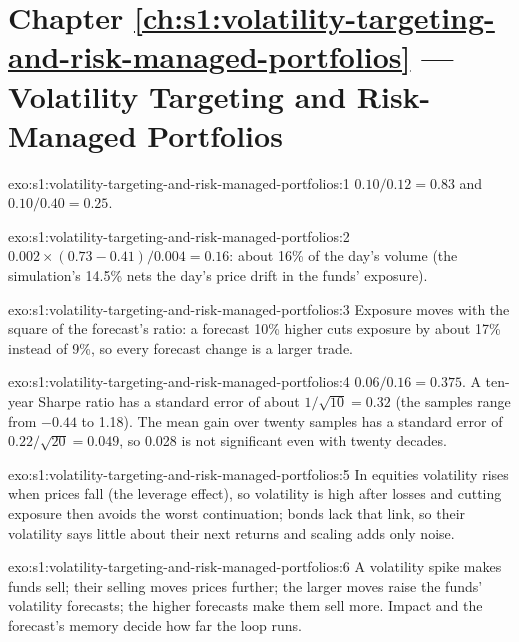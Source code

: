 \section*{Chapter \ref{ch:s1:volatility-targeting-and-risk-managed-portfolios} --- Volatility Targeting and Risk-Managed Portfolios}

\begin{solution}{exo:s1:volatility-targeting-and-risk-managed-portfolios:1}
$0.10/0.12 = 0.83$ and $0.10/0.40 = 0.25$.
\end{solution}

\begin{solution}{exo:s1:volatility-targeting-and-risk-managed-portfolios:2}
$0.002 \times (0.73 - 0.41)/0.004 = 0.16$: about 16\% of the day's volume (the simulation's 14.5\% nets the day's price drift in the funds' exposure).
\end{solution}

\begin{solution}{exo:s1:volatility-targeting-and-risk-managed-portfolios:3}
Exposure moves with the square of the forecast's ratio: a forecast 10\% higher cuts exposure by about 17\% instead of 9\%, so every forecast change is a
larger trade.
\end{solution}

\begin{solution}{exo:s1:volatility-targeting-and-risk-managed-portfolios:4}
$0.06/0.16 = 0.375$. A ten-year Sharpe ratio has a standard error of about $1/\sqrt{10} = 0.32$ (the samples range from $-0.44$ to 1.18). The mean gain over
twenty samples has a standard error of $0.22/\sqrt{20} = 0.049$, so 0.028 is not significant even with twenty decades.
\end{solution}

\begin{solution}{exo:s1:volatility-targeting-and-risk-managed-portfolios:5}
In equities volatility rises when prices fall (the leverage effect), so volatility is high after losses and cutting exposure then avoids the worst
continuation; bonds lack that link, so their volatility says little about their next returns and scaling adds only noise.
\end{solution}

\begin{solution}{exo:s1:volatility-targeting-and-risk-managed-portfolios:6}
A volatility spike makes funds sell; their selling moves prices further; the larger moves raise the funds' volatility forecasts; the higher forecasts
make them sell more. Impact and the forecast's memory decide how far the loop runs.
\end{solution}


